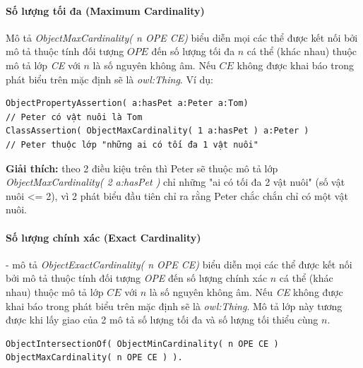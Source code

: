 \paragraph{Số lượng tối đa (Maximum Cardinality)} Mô tả \textit{ObjectMaxCardinality( n OPE CE)} biểu diễn mọi các thể được kết nối bởi mô tả thuộc tính đối tượng $OPE$ đến số lượng tối đa $n$ cá thể (khác nhau) thuộc mô tả lớp \textit{CE} với $n$ là số nguyên không âm. Nếu $CE$ không được khai báo trong phát biểu trên mặc định sẽ là \textit{owl:Thing}. Ví dụ:
\begin{verbatim}
ObjectPropertyAssertion( a:hasPet a:Peter a:Tom)
// Peter có vật nuôi là Tom
ClassAssertion( ObjectMaxCardinality( 1 a:hasPet ) a:Peter )
// Peter thuộc lớp "những ai có tối đa 1 vật nuôi"
\end{verbatim}
\textbf{Giải thích:} theo 2 điều kiệu trên thì Peter sẽ thuộc mô tả lớp \textit{ObjectMaxCardinality( 2 a:hasPet )} chỉ những "ai có tối đa 2 vật nuôi" (số vật nuôi <= 2), vì 2 phát biểu đầu tiên chỉ ra rằng Peter chắc chắn chỉ có một vật nuôi.

\paragraph{Số lượng chính xác (Exact Cardinality)} - mô tả \textit{ObjectExactCardinality( n OPE CE)} biểu diễn mọi các thể được kết nối bởi mô tả thuộc tính đối tượng \textit{OPE} đến số lượng chính xác $n$ cá thể (khác nhau) thuộc mô tả lớp $CE$ với $n$ là số nguyên không âm. Nếu \textit{CE} không được khai báo trong phát biểu trên mặc định sẽ là \textit{owl:Thing}. Mô tả lớp này tương được khi lấy giao của 2 mô tả số lượng tối đa và số lượng tối thiểu cùng $n$.
\begin{verbatim}
ObjectIntersectionOf( ObjectMinCardinality( n OPE CE ) 
ObjectMaxCardinality( n OPE CE ) ).
\end{verbatim}

